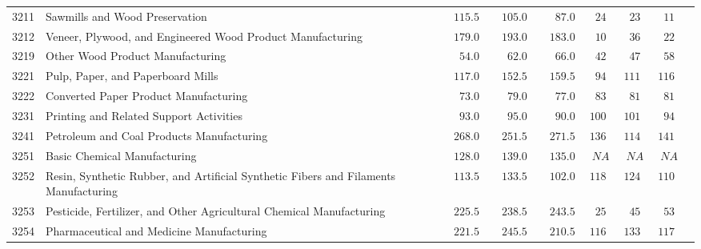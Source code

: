 \documentclass[9pt, oneside]{article}   	%
\begin{document}
\begin{longtable}{lp{3.5 in}ccccccc}
3211  & Sawmills and Wood Preservation & $\phantom{00}115.5$ & $\phantom{00}105.0$ & $\phantom{000}87.0$ & $\phantom{0}24$ & $\phantom{0}23$ & $\phantom{0}11$ \\
3212  & Veneer, Plywood, and Engineered Wood Product Manufacturing & $\phantom{00}179.0$ & $\phantom{00}193.0$ & $\phantom{00}183.0$ & $\phantom{0}10$ & $\phantom{0}36$ & $\phantom{0}22$ \\
3219  & Other Wood Product Manufacturing & $\phantom{000}54.0$ & $\phantom{000}62.0$ & $\phantom{000}66.0$ & $\phantom{0}42$ & $\phantom{0}47$ & $\phantom{0}58$ \\
3221  & Pulp, Paper, and Paperboard Mills & $\phantom{00}117.0$ & $\phantom{00}152.5$ & $\phantom{00}159.5$ & $\phantom{0}94$ & $111$ & $116$ \\
3222  & Converted Paper Product Manufacturing & $\phantom{000}73.0$ & $\phantom{000}79.0$ & $\phantom{000}77.0$ & $\phantom{0}83$ & $\phantom{0}81$ & $\phantom{0}81$ \\
3231  & Printing and Related Support Activities & $\phantom{000}93.0$ & $\phantom{000}95.0$ & $\phantom{000}90.0$ & $100$ & $101$ & $\phantom{0}94$ \\
3241  & Petroleum and Coal Products Manufacturing & $\phantom{00}268.0$ & $\phantom{00}251.5$ & $\phantom{00}271.5$ & $136$ & $114$ & $141$ \\
3251  & Basic Chemical Manufacturing & $\phantom{00}128.0$ & $\phantom{00}139.0$ & $\phantom{00}135.0$ & $\phantom{0}NA$ & $\phantom{0}NA$ & $\phantom{0}NA$ \\
3252  & Resin, Synthetic Rubber, and Artificial Synthetic Fibers and Filaments Manufacturing & $\phantom{00}113.5$ & $\phantom{00}133.5$ & $\phantom{00}102.0$ & $118$ & $124$ & $110$ \\
3253  & Pesticide, Fertilizer, and Other Agricultural Chemical Manufacturing & $\phantom{00}225.5$ & $\phantom{00}238.5$ & $\phantom{00}243.5$ & $\phantom{0}25$ & $\phantom{0}45$ & $\phantom{0}53$ \\
3254  & Pharmaceutical and Medicine Manufacturing & $\phantom{00}221.5$ & $\phantom{00}245.5$ & $\phantom{00}210.5$ & $116$ & $133$ & $117$ \\

\end{longtable}
\end{document}
